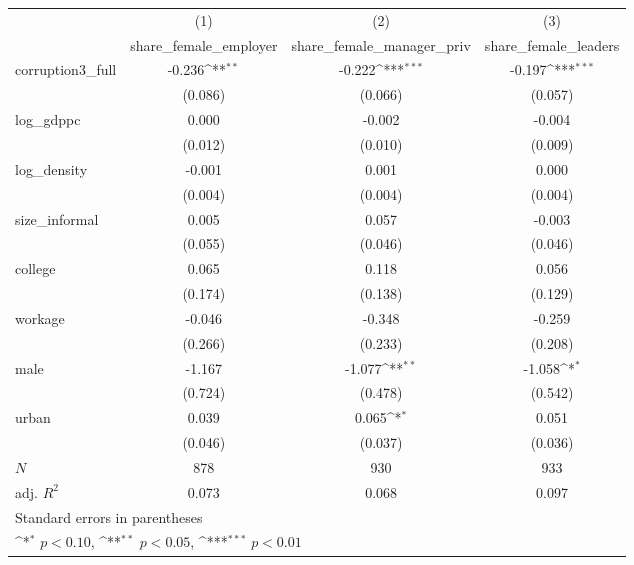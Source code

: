 {
\def\sym#1{\ifmmode^{#1}\else\(^{#1}\)\fi}
\begin{tabular}{l*{3}{c}}
\hline\hline
            &\multicolumn{1}{c}{(1)}&\multicolumn{1}{c}{(2)}&\multicolumn{1}{c}{(3)}\\
            &\multicolumn{1}{c}{share\_female\_employer}&\multicolumn{1}{c}{share\_female\_manager\_priv}&\multicolumn{1}{c}{share\_female\_leaders}\\
\hline
corruption3\_full&      -0.236\sym{**} &      -0.222\sym{***}&      -0.197\sym{***}\\
            &     (0.086)         &     (0.066)         &     (0.057)         \\
[1em]
log\_gdppc   &       0.000         &      -0.002         &      -0.004         \\
            &     (0.012)         &     (0.010)         &     (0.009)         \\
[1em]
log\_density &      -0.001         &       0.001         &       0.000         \\
            &     (0.004)         &     (0.004)         &     (0.004)         \\
[1em]
size\_informal&       0.005         &       0.057         &      -0.003         \\
            &     (0.055)         &     (0.046)         &     (0.046)         \\
[1em]
college     &       0.065         &       0.118         &       0.056         \\
            &     (0.174)         &     (0.138)         &     (0.129)         \\
[1em]
workage     &      -0.046         &      -0.348         &      -0.259         \\
            &     (0.266)         &     (0.233)         &     (0.208)         \\
[1em]
male        &      -1.167         &      -1.077\sym{**} &      -1.058\sym{*}  \\
            &     (0.724)         &     (0.478)         &     (0.542)         \\
[1em]
urban       &       0.039         &       0.065\sym{*}  &       0.051         \\
            &     (0.046)         &     (0.037)         &     (0.036)         \\
\hline
\(N\)       &         878         &         930         &         933         \\
adj. \(R^{2}\)&       0.073         &       0.068         &       0.097         \\
\hline\hline
\multicolumn{4}{l}{\footnotesize Standard errors in parentheses}\\
\multicolumn{4}{l}{\footnotesize \sym{*} \(p<0.10\), \sym{**} \(p<0.05\), \sym{***} \(p<0.01\)}\\
\end{tabular}
}
